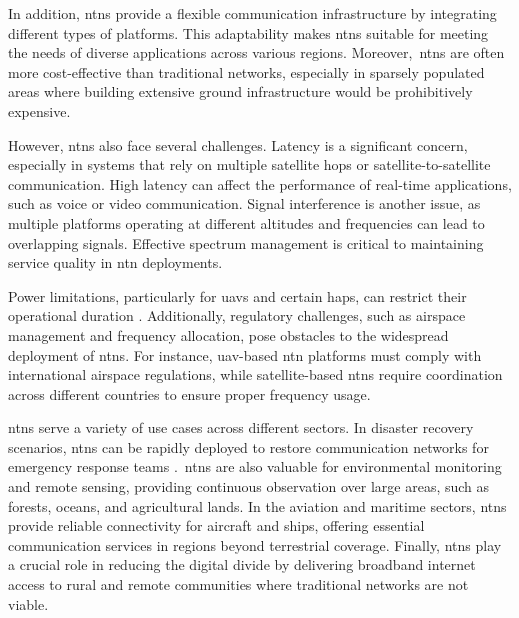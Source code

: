 In addition, \glspl{ntn} provide a flexible communication infrastructure by integrating different types of platforms. This adaptability makes \glspl{ntn} suitable for meeting the needs of diverse applications across various regions. Moreover,\ \glspl{ntn} are often more cost-effective than traditional networks, especially in sparsely populated areas where building extensive ground infrastructure would be prohibitively expensive.

However, \glspl{ntn} also face several challenges. Latency is a significant concern, especially in systems that rely on multiple satellite hops or satellite-to-satellite communication. High latency can affect the performance of real-time applications, such as voice or video communication. Signal interference is another issue, as multiple platforms operating at different altitudes and frequencies can lead to overlapping signals. Effective spectrum management is critical to maintaining service quality in \gls{ntn} deployments.

Power limitations, particularly for \glspl{uav} and certain \glspl{hap}, can restrict their operational duration \autocite{power_efficiency_uav}. Additionally, regulatory challenges, such as airspace management and frequency allocation, pose obstacles to the widespread deployment of \glspl{ntn}. For instance, \gls{uav}-based \gls{ntn} platforms must comply with international airspace regulations, while satellite-based \glspl{ntn} require coordination across different countries to ensure proper frequency usage.

\glspl{ntn} serve a variety of use cases across different sectors. In disaster recovery scenarios, \glspl{ntn} can be rapidly deployed to restore communication networks for emergency response teams \autocite{ntn_challenges_and_opportunities}.\ \glspl{ntn} are also valuable for environmental monitoring and remote sensing, providing continuous observation over large areas, such as forests, oceans, and agricultural lands. In the aviation and maritime sectors, \glspl{ntn} provide reliable connectivity for aircraft and ships, offering essential communication services in regions beyond terrestrial coverage. Finally, \glspl{ntn} play a crucial role in reducing the digital divide by delivering broadband internet access to rural and remote communities where traditional networks are not viable.
